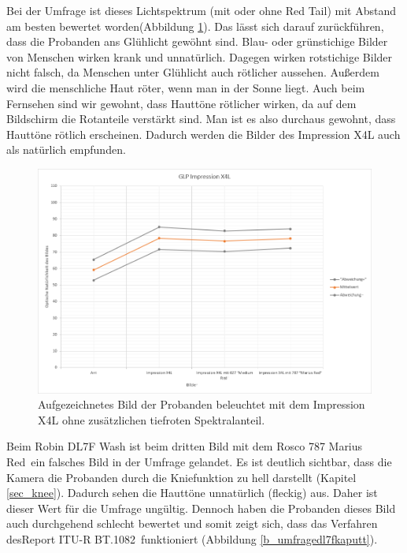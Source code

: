 Bei der Umfrage ist dieses Lichtspektrum (mit oder ohne \glqq Red Tail\grqq) mit Abstand am besten bewertet worden(Abbildung \ref{b_umfrageglp}). Das lässt sich darauf zurückführen, dass die Probanden ans Glühlicht gewöhnt sind. Blau- oder grünstichige Bilder von Menschen wirken krank und unnatürlich. Dagegen wirken rotstichige Bilder nicht falsch, da Menschen unter Glühlicht auch rötlicher aussehen. Außerdem wird die menschliche Haut röter, wenn man in der Sonne liegt. Auch beim Fernsehen sind wir gewohnt, dass Hauttöne rötlicher wirken, da auf dem Bildschirm die Rotanteile verstärkt sind. Man ist es also durchaus gewohnt, dass Hauttöne rötlich erscheinen. Dadurch werden die Bilder des Impression X4L auch als natürlich empfunden. 

\begin{figure}[H]     %
\centering
\includegraphics[width=1.0\textwidth]{bilder/umfrageglp} 
\caption {Aufgezeichnetes Bild der Probanden beleuchtet mit dem Impression X4L ohne zusätzlichen tiefroten Spektralanteil.} \label{b_umfrageglp}
\end{figure}


Beim Robin DL7F Wash ist beim dritten Bild mit dem Rosco 787 \glqq Marius Red\grqq\ ein falsches Bild in der Umfrage gelandet. Es ist deutlich sichtbar, dass die Kamera die Probanden durch die Kniefunktion zu hell darstellt (Kapitel \ref{sec_knee}). Dadurch sehen die Hauttöne unnatürlich (fleckig) aus. Daher ist dieser Wert für die Umfrage ungültig. Dennoch haben die Probanden dieses Bild auch durchgehend schlecht bewertet und somit zeigt sich, dass das Verfahren des\glqq Report ITU-R BT.1082\grqq\ funktioniert 
(Abbildung \ref{b_umfragedl7fkaputt}).

